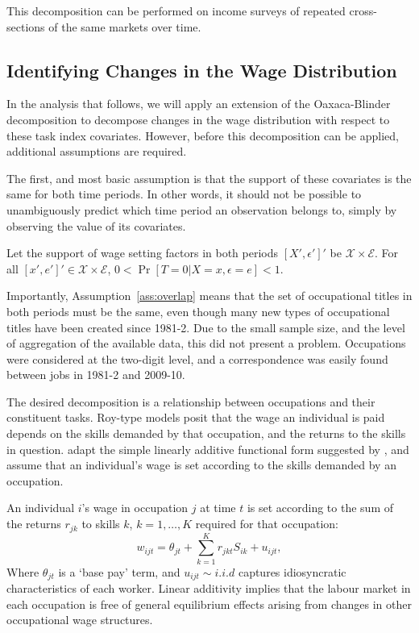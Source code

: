 This decomposition can be performed on income surveys of repeated cross-sections of the same markets over time.

\subsection{Identifying Changes in the Wage Distribution}
 \label{sec:id}

In the analysis that follows, we will apply an extension of the Oaxaca-Blinder decomposition to decompose changes in the wage distribution with respect to these task index covariates. However, before this decomposition can be applied, additional assumptions are required.

The first, and most basic assumption is that the support of these covariates is the same for both time periods. In other words, it should not be possible to unambiguously predict which time period an observation belongs to, simply by observing the value of its covariates. 
\begin{assumption} \label{ass:overlap}
  Let the support of wage setting factors in both periods $[X',\epsilon']'$ be $\mathcal{X}\times\mathcal{E}$. For all $[x',e']' \in \mathcal{X}\times\mathcal{E}$,  $0 < \Pr[T=0 | X=x, \epsilon=e] < 1$.
\end{assumption}
Importantly, Assumption~\ref{ass:overlap} means that the set of occupational titles in both periods must be the same, even though many new types of occupational titles have been created since 1981-2. Due to the small sample size, and the level of aggregation of the available data, this did not present a problem. Occupations were considered at the two-digit level, and a correspondence was easily found between jobs in 1981-2 and 2009-10.

The desired decomposition is a relationship between occupations and their constituent tasks. Roy-type models posit that the wage an individual is paid depends on the skills demanded by that occupation, and the returns to the skills in question. \citet{Firpo2011} adapt the simple linearly additive functional form suggested by \citet{Welch1969}, and assume that an individual's wage is set according to the skills demanded by an occupation.
\begin{assumption}
  An individual $i$'s wage in occupation $j$ at time $t$ is set according to the sum of the returns $r_{jk}$ to skills $k$, $k=1,\dots,K$ required for that occupation:
\begin{equation}
  w_{ijt} = \theta_{jt} + \sum_{k=1}^K r_{jkt}S_{ik} + u_{ijt}, \label{eq:linear}
\end{equation}
Where $\theta_{jt}$ is a `base pay' term, and $u_{ijt}\sim i.i.d$ captures idiosyncratic characteristics of each worker. Linear additivity implies that the labour market in each occupation is free of general equilibrium effects arising from changes in other occupational wage structures.
\end{assumption}

